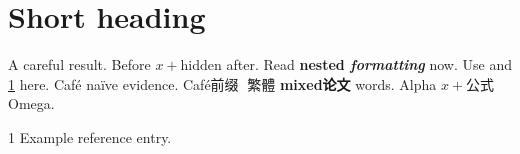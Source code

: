 \documentclass{article}
\begin{document}
\section{Short heading}\label{hidden-label}

A careful result. %
Before $x + \mathrm{hidden}$ after.
Read \textbf{nested \emph{formatting}} now.
Use \cite{hidden-citation} and \ref{hidden-label} here.
Café naïve evidence.
Café前缀𠀀 繁體 \textbf{mixed论文} words.
Alpha $x+\mathrm{公式}$ \cite{引文} Omega. %

\begin{thebibliography}{1}
 Example reference entry.
\end{thebibliography}
\end{document}
